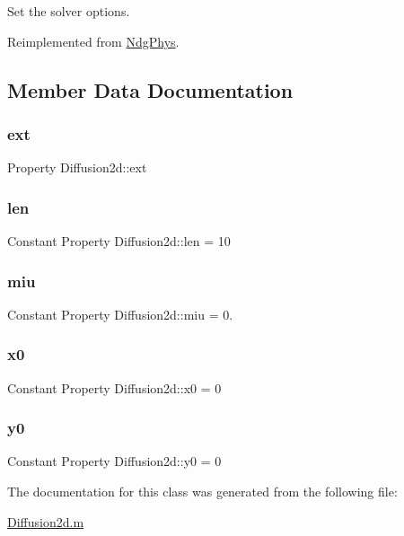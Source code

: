 Set the solver options. 



Reimplemented from \hyperlink{class_ndg_phys_a5cd323275f4098db166471c4b078ed17}{Ndg\+Phys}.



\subsection{Member Data Documentation}
\mbox{\label{class_diffusion2d_abaf2168972f0d76ab8a4433ae5304c9a}} 
\subsubsection{\texorpdfstring{ext}{ext}}
{\footnotesize\ttfamily Property Diffusion2d\+::ext}

\mbox{\label{class_diffusion2d_aa94b73fa9de9518db5f629ca1633f9a6}} 
\subsubsection{\texorpdfstring{len}{len}}
{\footnotesize\ttfamily Constant Property Diffusion2d\+::len = 10}

\mbox{\label{class_diffusion2d_ae05e974ed4809e0df4c9aa502366bd66}} 
\subsubsection{\texorpdfstring{miu}{miu}}
{\footnotesize\ttfamily Constant Property Diffusion2d\+::miu = 0.}

\mbox{\label{class_diffusion2d_ab2d897f02ea708eb701834384bdd2d9f}} 
\subsubsection{\texorpdfstring{x0}{x0}}
{\footnotesize\ttfamily Constant Property Diffusion2d\+::x0 = 0}

\mbox{\label{class_diffusion2d_ac1523513a40fbb1eb083bdcba1bc2239}} 
\subsubsection{\texorpdfstring{y0}{y0}}
{\footnotesize\ttfamily Constant Property Diffusion2d\+::y0 = 0}



The documentation for this class was generated from the following file\+:\begin{DoxyCompactItemize}
\item 
\hyperlink{_diffusion2d_8m}{Diffusion2d.\+m}\end{DoxyCompactItemize}
